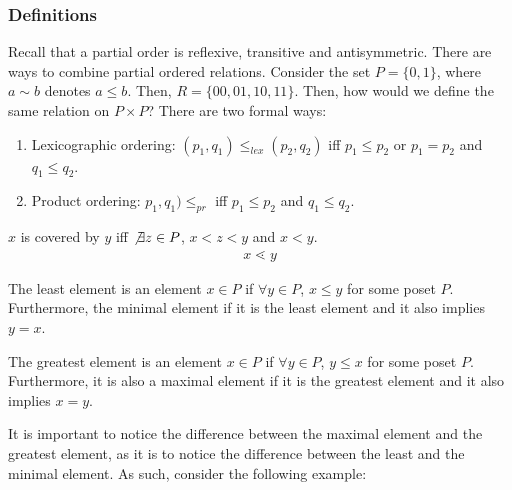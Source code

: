 \documentclass[a4paper]{article}
\theoremstyle{plain}
\theoremstyle{definition}
\newtheorem{defn}{Definition}[section]
\theoremstyle{remark}
\begin{document}
\subsubsection{Definitions}
Recall that a partial order is reflexive, transitive and antisymmetric. There are ways to combine partial ordered relations. Consider the set $P=\{ 0,1 \}$, where $a \sim b$ denotes $a \le b$. Then, $R = \{ 00, 01, 10, 11 \}$. Then, how would we define the same relation on  $P \times P$? There are two formal ways:
\begin{enumerate}
	\item Lexicographic ordering: $(p_1,q_1) \le_{lex}  (p_2,q_2)$ iff $p_1 \le  p_2$ or $p_1 = p_2$ and $q_1 \le q_2$.
	\item Product ordering: $p_1,q_1) \le _{pr}$ iff $p_1 \le  p_2$ and $q_1 \le q_2$.
\end{enumerate}
\begin{tcolorbox}[colback=black!3!white,colframe=black!60!white,title=\begin{defn}Covering \label{Covering}\end{defn}] $x$ is covered by $y$ iff $\not\exists z \in P$, $x < z < y$ and $x<y$.
\begin{align}
x \lessdot y
\end{align}
\end{tcolorbox}
\begin{tcolorbox}[colback=black!3!white,colframe=black!60!white,title=\begin{defn}The least element \label{The least element}\end{defn}]
The least element is an element $x \in P$ if $\forall y \in P$, $x \le  y$ for some poset $P$. Furthermore, the minimal element if it is the least element and it also implies $y=x$.
\end{tcolorbox}
\begin{tcolorbox}[colback=black!3!white,colframe=black!60!white,title=\begin{defn}The greatest element \label{The greatest element}\end{defn}]
The greatest element is an element $x \in P$ if $\forall y \in P$, $y \le  x$ for some poset $P$. Furthermore, it is also a maximal element if it is the greatest element and it also implies  $x=y$.
\end{tcolorbox}
It is important to notice the difference between the maximal element and the greatest element, as it is to notice the difference between the least and the minimal element. As such, consider the following example:
\end{document}
